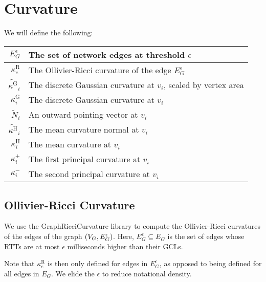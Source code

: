 
\section{Curvature}
We will define the following: \begin{center}\begin{tabular}{r|l}
	\(E_G^\epsilon\) & The set of network edges at threshold \(\epsilon\) \\ \hline
	\(\kappa^\text{R}_e\) & The Ollivier-Ricci curvature of the edge \(E_G^\epsilon\) \\ \hline
	\(\widetilde{\kappa^\text{G}}_i\) & The discrete Gaussian curvature at \(v_i\), scaled by vertex area \\ \hline
	\(\kappa^\text{G}_i\) & The discrete Gaussian curvature at \(v_i\) \\ \hline
	\(\widetilde{N}_i\) & An outward pointing vector at \(v_i\) \\ \hline
	\(\widetilde{\kappa^\text{H}}_i\) & The mean curvature normal at \(v_i\) \\ \hline
	\(\kappa^\text{H}_i\) & The mean curvature at \(v_i\) \\ \hline
	\(\kappa^+_i\) & The first principal curvature at \(v_i\) \\ \hline
	\(\kappa^-_i\) & The second principal curvature at \(v_i\)
\end{tabular}\end{center}

\subsection{Ollivier-Ricci Curvature}
We use the GraphRicciCurvature library \cite{ni2019community} to compute the Ollivier-Ricci curvatures of the edges of the graph \(\pof{V_G, E_G^\epsilon}\). Here, \(E_G^\epsilon \subseteq E_G\) is the set of edges whose RTTs are at most \(\epsilon\) milliseconds higher than their GCLs.

Note that \(\kappa^\text{R}_e\) is then only defined for edges in \(E_G^\epsilon\), as opposed to being defined for all edges in \(E_G\). We elide the \(\epsilon\) to reduce notational density.

